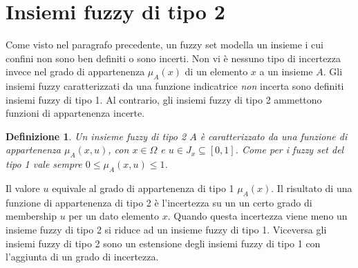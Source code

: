 \documentclass [11pt,a4paper,twoside,openright] {book}
\newtheorem{fuzzyset2}{Definizione}
\begin{document}
\section{Insiemi fuzzy di tipo 2}
Come visto nel paragrafo precedente, un fuzzy set modella un insieme i cui confini non sono ben definiti o sono incerti. Non vi è nessuno tipo di incertezza invece nel grado di appartenenza $\mu_A(x)$ di un elemento $x$ a un insieme $A$. Gli insiemi fuzzy caratterizzati da una funzione indicatrice \textit{non} incerta sono definiti insiemi fuzzy di tipo 1. Al contrario, gli insiemi fuzzy di tipo 2 ammettono funzioni di appartenenza incerte\cite{mendel2002type}.
\begin{fuzzyset2}
Un insieme fuzzy di tipo 2 $A$ è caratterizzato da una funzione di appartenenza $\mu_A(x,u)$, con $x \in \Omega$ e $u \in J_x \subseteq [0,1]$. Come per i fuzzy set del tipo 1 vale sempre $0 \leq \mu_A(x,u) \leq 1$.
\end{fuzzyset2}
Il valore $u$ equivale al grado di appartenenza di tipo 1 $\mu_A(x)$. Il risultato di una funzione di appartenenza di tipo 2 è l'incertezza su un un certo grado di membership $u$ per un dato elemento $x$. Quando questa incertezza viene meno un insieme fuzzy di tipo 2 si riduce ad un insieme fuzzy di tipo 1. Viceversa gli insiemi fuzzy di tipo 2 sono un estensione degli insiemi fuzzy di tipo 1 con l'aggiunta di un grado di incertezza.
\end{document}
